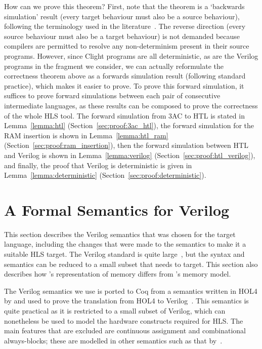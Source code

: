 How can we prove this theorem? First, note that the theorem is a `backwards
simulation' result (every target behaviour must also be a source behaviour),
following the terminology used in the \compcert{}
literature~\cite{leroy09_formal_verif_realis_compil}. The reverse direction
(every source behaviour must also be a target behaviour) is not demanded because
compilers are permitted to resolve any non-determinism present in their source
programs. However, since Clight programs are all deterministic, as are the
Verilog programs in the fragment we consider, we can actually reformulate the
correctness theorem above as a forwards simulation result (following standard
\compcert{} practice), which makes it easier to prove.  To prove this forward
simulation, it suffices to prove forward simulations between each pair of
consecutive intermediate languages, as these results can be composed to prove
the correctness of the whole HLS tool.  The forward simulation from 3AC to HTL
is stated in Lemma~\ref{lemma:htl} (Section~\ref{sec:proof:3ac_htl}), the
forward simulation for the RAM insertion is shown in Lemma~\ref{lemma:htl_ram}
(Section~\ref{sec:proof:ram_insertion}), then the forward simulation between HTL
and Verilog is shown in Lemma~\ref{lemma:verilog}
(Section~\ref{sec:proof:htl_verilog}), and finally, the proof that Verilog is
deterministic is given in Lemma~\ref{lemma:deterministic}
(Section~\ref{sec:proof:deterministic}).

\section{A Formal Semantics for Verilog}\label{sec:verilog}

\newcommand{\alwaysblock}{always-block}

This section describes the Verilog semantics that was chosen for the target language, including the changes that were made to the semantics to make it a suitable HLS target.  The Verilog standard is quite large~\cite{06_ieee_stand_veril_hardw_descr_languag,05_ieee_stand_veril_regis_trans_level_synth}, but the syntax and semantics can be reduced to a small subset that \vericert{} needs to target.  This section  also describes how \vericert{}'s representation of memory differs from \compcert{}'s memory model.

The Verilog semantics we use is ported to Coq from a semantics written in HOL4 by \textcite{loow19_proof_trans_veril_devel_hol} and used to prove the translation from HOL4 to Verilog~\cite{loow19_verif_compil_verif_proces}. %
This semantics is quite practical as it is restricted to a small subset of Verilog, which can nonetheless be used to model the hardware constructs required for HLS.  The main features that are excluded are continuous assignment and combinational \alwaysblock{}s; these are modelled in other semantics such as that by~\textcite{meredith10_veril}. %

